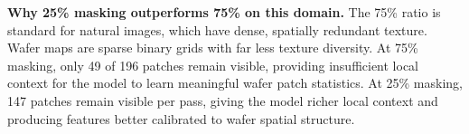 \textbf{Why 25\% masking outperforms 75\% on this domain.} The 75\% ratio is standard for natural images, which have dense, spatially redundant texture. Wafer maps are sparse binary grids with far less texture diversity. At 75\% masking, only 49 of 196 patches remain visible, providing insufficient local context for the model to learn meaningful wafer patch statistics. At 25\% masking, 147 patches remain visible per pass, giving the model richer local context and producing features better calibrated to wafer spatial structure.

